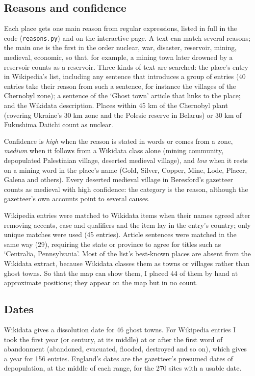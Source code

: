 \documentclass[11pt,a4paper]{article}
\begin{document}
\subsection{Reasons and confidence}
Each place gets one main reason from regular expressions, listed in full in the code (\texttt{reasons.py}) and on the interactive page. A text can match several reasons; the main one is the first in the order nuclear, war, disaster, reservoir, mining, medieval, economic, so that, for example, a mining town later drowned by a reservoir counts as a reservoir. Three kinds of text are searched: the place's entry in Wikipedia's list, including any sentence that introduces a group of entries (40 entries take their reason from such a sentence, for instance the villages of the Chernobyl zone); a sentence of the `Ghost town' article that links to the place; and the Wikidata description. Places within 45 km of the Chernobyl plant (covering Ukraine's 30 km zone and the Polesie reserve in Belarus) or 30 km of Fukushima Daiichi count as nuclear.

Confidence is \emph{high} when the reason is stated in words or comes from a zone, \emph{medium} when it follows from a Wikidata class alone (mining community, depopulated Palestinian village, deserted medieval village), and \emph{low} when it rests on a mining word in the place's name (Gold, Silver, Copper, Mine, Lode, Placer, Galena and others). Every deserted medieval village in Beresford's gazetteer counts as medieval with high confidence: the category is the reason, although the gazetteer's own accounts point to several causes.

Wikipedia entries were matched to Wikidata items when their names agreed after removing accents, case and qualifiers and the item lay in the entry's country; only unique matches were used (45 entries). Article sentences were matched in the same way (29), requiring the state or province to agree for titles such as `Centralia, Pennsylvania'. Most of the list's best-known places are absent from the Wikidata extract, because Wikidata classes them as towns or villages rather than ghost towns. So that the map can show them, I placed 44 of them by hand at approximate positions; they appear on the map but in no count.

\subsection{Dates}
Wikidata gives a dissolution date for 46 ghost towns. For Wikipedia entries I took the first year (or century, at its middle) at or after the first word of abandonment (abandoned, evacuated, flooded, destroyed and so on), which gives a year for 156 entries. England's dates are the gazetteer's presumed dates of depopulation, at the middle of each range, for the 270 sites with a usable date.
\end{document}
